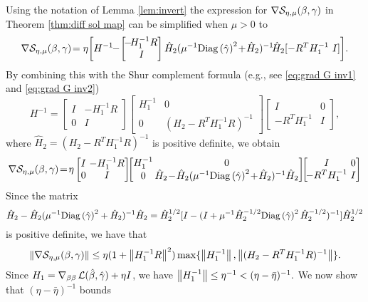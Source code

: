 Using the notation of Lemma \ref{lem:invert} the expression for 
$\nabla \mathcal{S}_{\eta,\mu}(\beta,\gamma)$ in 
Theorem \ref{thm:diff sol map} can be simplified when $\mu>0$ to
{\small\[
\nabla \SS_\emu(\beta,\gam)\!=\eta
\!\left[ H^{-1}\!\!-\!
\begin{bmatrix}\!-\!H_1^{-1}R\\ I\end{bmatrix}
\hat H_2(\mu^{-1}\Diag{\hgam}^2\!+\!\hat H_2)^{-1}\!\hat H_2
[-R^TH_1^{-1}\ I]
\right]\! .
\]}
By combining this with the Shur complement formula
(e.g., see \eqref{eq:grad G inv1} and \eqref{eq:grad G inv2})
\[
H^{-1}=\begin{bmatrix}I&-H_1^{-1}R\\ 0&I\end{bmatrix}
\begin{bmatrix}H_1^{-1}&0\\ 0&(H_2-R^TH_1^{-1}R)^{-1}\end{bmatrix}
\begin{bmatrix}I&0\\ -R^TH_1^{-1}&I\end{bmatrix},
\]
where $\hat H_2=(H_2-R^TH_1^{-1}R)^{-1}$ is positive definite, we obtain  
{\small\[
\nabla \SS_\emu(\beta,\gam)\!=\!\eta
\begin{bmatrix}I&\!\!\!\!-H_1^{-1}R\\ 0&\!\!\!\!I\end{bmatrix}\!\!
\begin{bmatrix}H_1^{-1}&\!\!\!\!\!0\\ 
0&\!\!\!\!\!\hat H_2\!-\!\hat H_2(\mu^{-1}\Diag{\hgam}^2\!+\!\hat H_2)^{-1}\hat H_2
\end{bmatrix}\!\!
\begin{bmatrix}\!I&\!\!\!\!0\\ \!-R^TH_1^{-1}&\!\!\!\!I\end{bmatrix}
\]}
Since the matrix
\[
\hat H_2-\hat H_2(\mu^{-1}\mathrm{Diag}\left({\hat{\gamma}}\right)^2+\hat H_2)^{-1}\hat H_2=
\hat H_2^{1/2}[I-(I+\mu^{-1}\hat H_2^{-1/2}\mathrm{Diag}\left({\hat{\gamma}}\right)^2\hat H_2^{-1/2})^{-1}]
\hat H_2^{1/2}
\]
is positive definite, we have that
\begin{equation}\label{eq:grad S bound}
\left\Vert \nabla \mathcal{S}_{\eta,\mu}(\beta,\gamma)\right\Vert\le
\eta(1+\left\Vert H_1^{-1}R\right\Vert^2)
\max\{\left\Vert H_1^{-1}\right\Vert,\left\Vert (H_2-R^TH_1^{-1}R)^{-1}\right\Vert\}.
\end{equation}
Since $H_1=\nabla_{\beta\beta}\operatorname{\mathcal{L}}(\hat{\beta},{\hat{\gamma}})+\eta I$, we have 
\(
\left\Vert H_1^{-1}\right\Vert\le \eta^{-1}<(\eta-\bar\eta)^{-1}.
\)
We now show that  $(\eta-\bar\eta)^{-1}$ bounds
